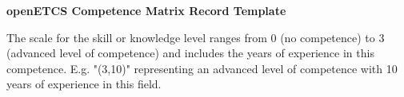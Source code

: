 \documentclass[a4paper, 11pt]{article}
\newcommand{\ra}[1]{\renewcommand{\arraystretch}{#1}}
\begin{document}
\begin{center} \huge\bf openETCS Competence Matrix Record Template\end{center}

\vspace{1\baselineskip}\vspace{-\parskip}

\begin{center}

The scale for the skill or knowledge level ranges from 0 (no competence) to 3 (advanced level of competence) and includes the years of experience in this competence. \newline
E.g. "(3,10)" representing an advanced level of competence with 10 years of experience in this field.


     \begin{longtable}{|r|r|r|r|r|r|r|r|}


\end{longtable}
\end{center}
\end{document}

